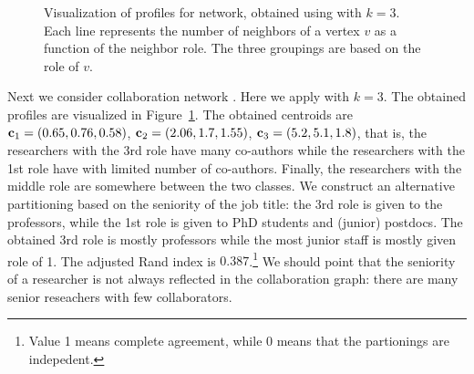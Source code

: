 \begin{figure}[ht!]
\caption{Visualization of profiles for \collab network, obtained using \alginitdeg with $k = 3$.
Each line represents the number of neighbors of a vertex $v$ as a
function of the neighbor role. The three groupings are based on the role of $v$.}
\label{fig:collab}
\end{figure}


Next we consider collaboration network \collab. Here we apply \alginitdeg
with $k = 3$. The obtained profiles are visualized in Figure~\ref{fig:collab}.
The obtained centroids are
$\mathbf{c}_1 = (0.65, 0.76, 0.58)$, $\mathbf{c}_2 = (2.06, 1.7, 1.55)$, $\mathbf{c}_3 = (5.2, 5.1, 1.8)$, 
that is, the researchers with the 3rd role have many co-authors while the researchers with the 1st role
have with limited number of co-authors. Finally, the researchers with the middle role are somewhere between
the two classes. We construct an alternative partitioning based on the seniority of the job title:
the 3rd role is given to the professors, while the 1st role is given to PhD students and (junior) postdocs.
The obtained 3rd role is mostly professors while the most junior staff is mostly given role of 1.
The adjusted Rand index is $0.387$.\footnote{Value 1 means complete agreement, 
while 0 means that the partionings are indepedent.}
We should point that the seniority of a researcher is not always reflected in the collaboration graph: 
there are many senior reseachers with few collaborators.

